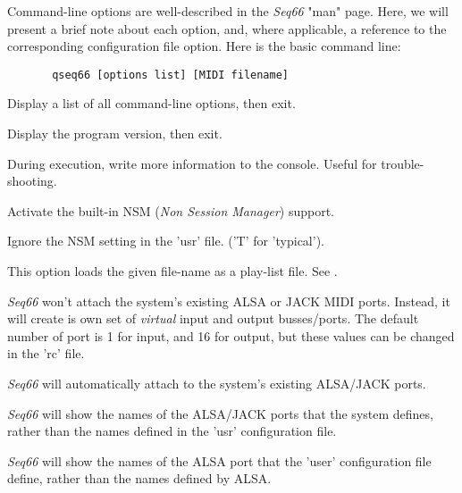    Command-line options are well-described in the \textsl{Seq66} "man" page.
   Here, we will present a brief note about each option, and, where applicable, a
   reference to the corresponding configuration file option.
   Here is the basic command line:

   \begin{verbatim}
       qseq66 [options list] [MIDI filename]
   \end{verbatim}

      Display a list of all command-line options, then exit.

      Display the program version, then exit.

      During execution, write more information to the console.  Useful for
      trouble-shooting.
   
      Activate the built-in NSM (\textsl{Non Session Manager}) support.

      Ignore the NSM setting in the 'usr' file. ('T' for 'typical').

      This option loads the given file-name as a play-list file.
      See .



      \textsl{Seq66} won't attach the system's existing ALSA or JACK MIDI ports.
      Instead, it will create is own set of \textsl{virtual}
      input and output busses/ports.  The default number of port is 1 for input,
      and 16 for output, but these values can be changed in the 'rc' file.


      \textsl{Seq66} will automatically attach to the system's existing
      ALSA/JACK ports.


      \textsl{Seq66} will show the names of the ALSA/JACK ports that the system
      defines, rather than the names defined in the 'usr' configuration file.

      \textsl{Seq66} will show the names of the ALSA port that the 'user'
      configuration file define, rather than the names defined by ALSA.

